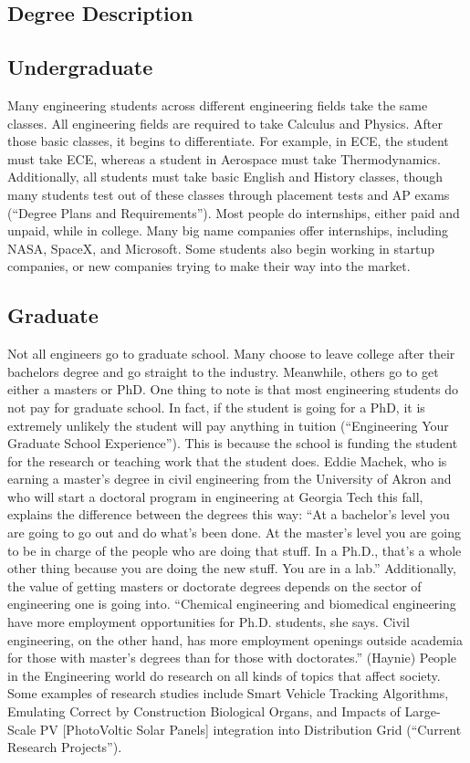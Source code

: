 \begin{multicols}{2}

\section{Degree Description}
    \subsection{Undergraduate}
        Many engineering students across different engineering fields take the same classes. All engineering fields are required to take Calculus and Physics. After those basic classes, it begins to differentiate. For example, in ECE, the student must take ECE, whereas a student in Aerospace must take Thermodynamics. Additionally, all students must take basic English and History classes, though many students test out of these classes through placement tests and AP exams (“Degree Plans and Requirements”). 
        Most people do internships, either paid and unpaid, while in college. Many big name companies offer internships, including NASA, SpaceX, and Microsoft. Some students also begin working in startup companies, or new companies trying to make their way into the market. 
    \subsection{Graduate}
        Not all engineers go to graduate school. Many choose to leave college after their bachelors degree and go straight to the industry. Meanwhile, others go to get either a masters or PhD. One thing to note is that most engineering students do not pay for graduate school. In fact, if the student is going for a PhD, it is extremely unlikely the student will pay anything in tuition (“Engineering Your Graduate School Experience”). This is because the school is funding the student for the research or teaching work that the student does. Eddie Machek, who is earning a master's degree in civil engineering from the University of Akron and who will start a doctoral program in engineering at Georgia Tech this fall, explains the difference between the degrees this way: “At a bachelor's level you are going to go out and do what's been done. At the master's level you are going to be in charge of the people who are doing that stuff. In a Ph.D., that's a whole other thing because you are doing the new stuff. You are in a lab.” Additionally, the value of getting masters or doctorate degrees depends on the sector of engineering one is going into. “Chemical engineering and biomedical engineering have more employment opportunities for Ph.D. students, she says. Civil engineering, on the other hand, has more employment openings outside academia for those with master’s degrees than for those with doctorates.”  (Haynie) 
        People in the Engineering world do research on all kinds of topics that affect society. Some examples of research studies include Smart Vehicle Tracking Algorithms, Emulating Correct by Construction Biological Organs, and Impacts of Large-Scale PV [PhotoVoltic Solar Panels] integration into Distribution Grid (“Current Research Projects”). 

\end{multicols}
